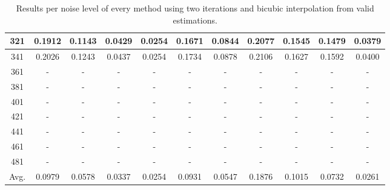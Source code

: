 \begin{table}[ht!]
\begin{tabular}{c|c|c|c|c|c|c|c|c|c|c}
321 & 0.1912 & 0.1143 & 0.0429 & 0.0254 & 0.1671 & 0.0844 & 0.2077 & 0.1545 & 0.1479 & 0.0379 \\ \hline
341 & 0.2026 & 0.1243 & 0.0437 & 0.0254 & 0.1734 & 0.0878 & 0.2106 & 0.1627 & 0.1592 & 0.0400 \\ \hline
361 & - & - & - & - & - & - & - & - & - & - \\ \hline
381 & - & - & - & - & - & - & - & - & - & - \\ \hline
401 & - & - & - & - & - & - & - & - & - & - \\ \hline
421 & - & - & - & - & - & - & - & - & - & - \\ \hline
441 & - & - & - & - & - & - & - & - & - & - \\ \hline
461 & - & - & - & - & - & - & - & - & - & - \\ \hline
481 & - & - & - & - & - & - & - & - & - & - \\ \hline
Avg.  & 0.0979 & 0.0578 & 0.0337 & 0.0254 & 0.0931 & 0.0547 & 0.1876 & 0.1015 & 0.0732 & 0.0261 \\ \hline
\end{tabular}
\caption{Results per noise level of every method using two iterations and bicubic interpolation from valid estimations.}
\label{tab:2itCperNoiseValid}
\end{table}


